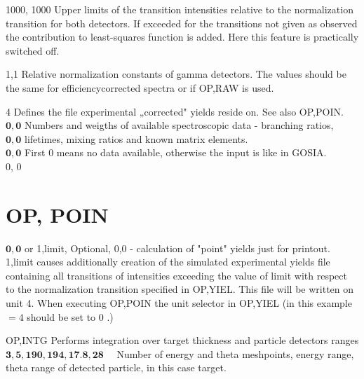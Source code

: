 \documentclass[10pt]{article}
\begin{document}
1000, 1000 Upper limits of the transition intensities relative to the normalization transition for both detectors. If exceeded for the transitions not given as observed the contribution to least-squares function is added. Here this feature is practically switched off.

1,1 Relative normalization constants of gamma detectors. The values should be the same for efficiencycorrected spectra or if OP,RAW is used.

4 Defines the file experimental „corrected" yields reside on. See also OP,POIN.\\
$\mathbf{0}, \mathbf{0}$ Numbers and weigths of available spectroscopic data - branching ratios,\\
$\mathbf{0}, \mathbf{0}$ lifetimes, mixing ratios and known matrix elements.\\
$\mathbf{0}, \mathbf{0}$ First 0 means no data available, otherwise the input is like in GOSIA.\\
0, 0

\section*{OP, POIN}
$\mathbf{0 , 0}$ or 1,limit, Optional, 0,0 - calculation of "point" yields just for printout. 1,limit causes additionally creation of the simulated experimental yields file containing all transitions of intensities exceeding the value of limit with respect to the normalization transition specified in OP,YIEL. This file will be written on unit 4. When executing OP,POIN the unit selector in OP,YIEL (in this example $=4$ should be set to 0 .)

OP,INTG Performs integration over target thickness and particle detectors ranges\\
$\mathbf{3}, \mathbf{5}, \mathbf{1 9 0}, \mathbf{1 9 4}, \mathbf{1 7 . 8}, \mathbf{2 8} \quad$ Number of energy and theta meshpoints, energy range, theta range of detected particle, in this case target.
\end{document}
